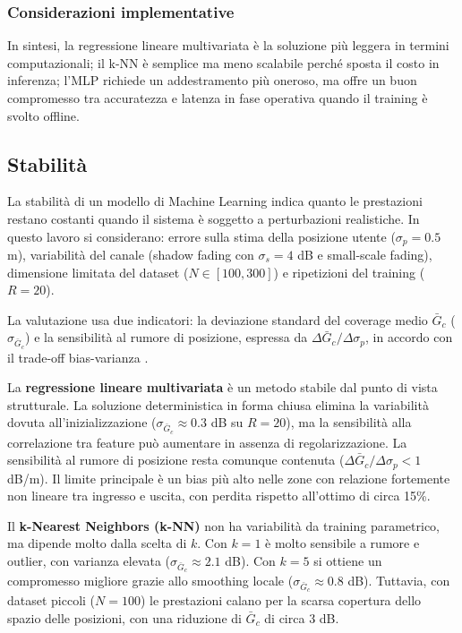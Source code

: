 \documentclass[12pt,a4paper]{report}
\begin{document}
\subsubsection{Considerazioni implementative}
In sintesi, la regressione lineare multivariata \`e la soluzione
pi\`u leggera in termini computazionali; il k-NN \`e semplice ma meno
scalabile perch\'e sposta il costo in inferenza; l'MLP richiede un
addestramento pi\`u oneroso, ma offre un buon compromesso tra
accuratezza e latenza in fase operativa quando il training \`e svolto offline.

\subsection{Stabilità}
La stabilità di un modello di Machine Learning indica quanto le
prestazioni restano costanti quando il sistema è soggetto a
perturbazioni realistiche. In questo lavoro si considerano: errore
sulla stima della posizione utente ($\sigma_p = 0.5$ m), variabilità
del canale (shadow fading con $\sigma_s = 4$ dB e small-scale
fading), dimensione limitata del dataset ($N \in [100,300]$) e
ripetizioni del training ($R=20$).

La valutazione usa due indicatori: la deviazione standard del
coverage medio $\bar{G}_c$ ($\sigma_{\bar{G}_c}$) e la sensibilità al
rumore di posizione, espressa da $\Delta \bar{G}_c / \Delta
\sigma_p$, in accordo con il trade-off bias-varianza \cite{hastie2009esl}.

La \textbf{regressione lineare multivariata} è un metodo stabile dal
punto di vista strutturale. La soluzione deterministica in forma
chiusa elimina la variabilità dovuta all'inizializzazione
($\sigma_{\bar{G}_c} \approx 0.3$ dB su $R=20$), ma la sensibilità
alla correlazione tra feature può aumentare in assenza di
regolarizzazione. La sensibilità al rumore di posizione resta
comunque contenuta ($\Delta \bar{G}_c / \Delta \sigma_p < 1$ dB/m).
Il limite principale è un bias più alto nelle zone con relazione
fortemente non lineare tra ingresso e uscita, con perdita rispetto
all'ottimo di circa 15\%.

Il \textbf{k-Nearest Neighbors (k-NN)} non ha variabilità da training
parametrico, ma dipende molto dalla scelta di $k$. Con $k=1$ è molto
sensibile a rumore e outlier, con varianza elevata
($\sigma_{\bar{G}_c} \approx 2.1$ dB). Con $k=5$ si ottiene un
compromesso migliore grazie allo smoothing locale
($\sigma_{\bar{G}_c} \approx 0.8$ dB). Tuttavia, con dataset piccoli
($N=100$) le prestazioni calano per la scarsa copertura dello spazio
delle posizioni, con una riduzione di $\bar{G}_c$ di circa 3 dB.
\end{document}
